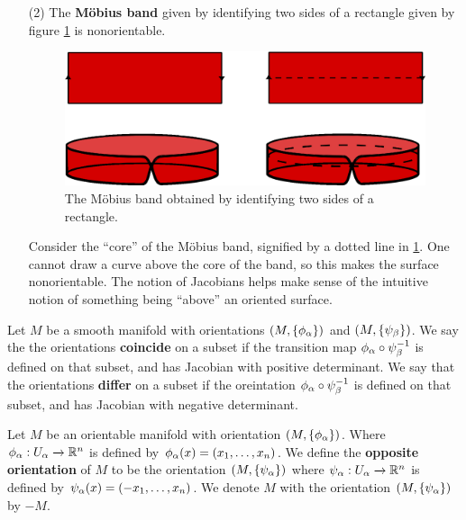 \begin{example}
\begin{enumerate}
        \item[(2)] The \textbf{M\"obius band} given by identifying two sides of
            a rectangle given by figure \ref{figure_1.6} is nonorientable.
            \begin{figure}[h]
                \centering
                \includegraphics[scale=0.5]{Figures/Chapter1/mobius_band.eps}
                \caption{The M\"obius band obtained by identifying two sides of
                a rectangle.}
                \label{figure_1.6}
            \end{figure}
            Consider the ``core'' of the M\"obius band, signified by a dotted
            line in \ref{figure_1.6}. One cannot draw a curve above the core of
            the band, so this makes the surface nonorientable. The notion of
            Jacobians helps make sense of the intuitive notion of something
            being ``above'' an oriented surface.
    \end{enumerate}
\end{example}

\begin{definition}
    Let $M$ be a smooth manifold with orientations $(M,\{\phi_\alpha\})$ and
    $(M,\{\psi_\beta\})$. We say the the orientations \textbf{coincide} on a subset
    if the transition map $\phi_\alpha \circ \psi_\beta^{-1}$ is defined on that
    subset, and has Jacobian with positive determinant. We say that the
    orientations \textbf{differ} on a subset if the oreintation $\phi_\alpha \circ
    \psi_\beta^{-1}$ is defined on that subset, and has Jacobian with negative
    determinant.
\end{definition}

\begin{definition}
    Let $M$ be an orientable manifold with orientation $(M,\{\phi_\alpha\})$. Where
    $\phi_\alpha:U_\alpha \xrightarrow{} \mathbb{R}^n$ is defined by $\phi_\alpha(x)=(x_1, \dots,
    x_n)$. We define the \textbf{opposite orientation} of $M$ to be the
    orientation $(M,\{\psi_\alpha\})$ where $\psi_\alpha:U_\alpha \xrightarrow{} \mathbb{R}^n$ is
    defined by $\psi_\alpha(x)=(-x_1, \dots, x_n)$. We denote $M$ with the
    orientation $(M,\{\psi_\alpha\})$ by $-M$.
\end{definition}

